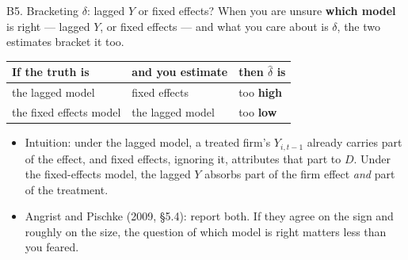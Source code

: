 \documentclass[
  11pt,
  ignorenonframetext,
  aspectratio=169,
]{beamer}
\providecommand{\tightlist}{%
  \setlength{\itemsep}{0pt}\setlength{\parskip}{0pt}}
\begin{document}
\begin{frame}{B5. Bracketing \(\delta\): lagged \(Y\) or fixed effects?}
\protect{}\label{b5.-bracketing-delta-lagged-y-or-fixed-effects}
When you are unsure \textbf{which model} is right --- lagged \(Y\), or
fixed effects --- and what you care about is \(\delta\), the two
estimates bracket it too.

\begin{center}\small
\begin{tabular}{lll}
\toprule
If the truth is & and you estimate & then $\hat\delta$ is \\
\midrule
the lagged model & fixed effects      & too \textbf{high} \\
the fixed effects model & the lagged model & too \textbf{low} \\
\bottomrule
\end{tabular}
\end{center}

\begin{itemize}
\tightlist
\item
  Intuition: under the lagged model, a treated firm's \(Y_{i,t-1}\)
  already carries part of the effect, and fixed effects, ignoring it,
  attributes that part to \(D\). Under the fixed-effects model, the
  lagged \(Y\) absorbs part of the firm effect \emph{and} part of the
  treatment.
\item
  Angrist and Pischke (2009, §5.4): report both. If they agree on the
  sign and roughly on the size, the question of which model is right
  matters less than you feared.
\end{itemize}
\end{frame}
\end{document}
